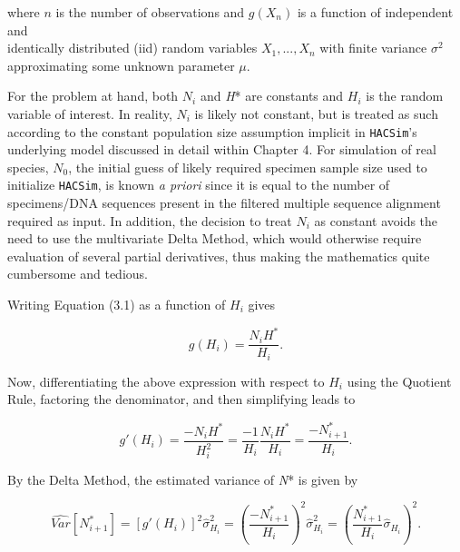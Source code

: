 \noindent where $n$ is the number of observations and $g(X_n)$ is a function of independent and \\ identically distributed (iid) random variables $X_1,...,X_n$ with finite variance $\sigma^2$ \\ approximating some unknown parameter $\mu$.

\vspace{5mm}

For the problem at hand, both $N_i$ and \textit{H}* are constants and $H_i$ is the random variable of interest. In reality, $N_i$ is likely not constant, but is treated as such according to the constant population size assumption implicit in {\tt HACSim}'s underlying model discussed in detail within Chapter 4. For simulation of real species, $N_0$, the initial guess of likely required specimen sample size used to initialize {\tt HACSim}, is known \textit{a priori} since it is equal to the number of specimens/DNA sequences present in the filtered multiple sequence alignment required as input. In addition, the decision to treat $N_i$ as constant avoids the need to use the multivariate Delta Method, which would otherwise require evaluation of several partial derivatives, thus making the mathematics quite cumbersome and tedious.  

\vspace{5mm}

Writing Equation (3.1) as a function of $H_i$ gives

\begin{equation}
g(H_i) = \frac{N_iH^*}{H_i}.
\end{equation}

\vspace{5mm}

Now, differentiating the above expression with respect to $H_i$ using the Quotient Rule, factoring the denominator, and then simplifying leads to

\begin{equation}
g'(H_i) = \frac{-N_iH^*}{H_i^2} = \frac{-1}{H_i}\frac{N_iH^*}{H_i} = \frac{-N^*_{i+1}}{H_i}.
\end{equation}

\vspace{5mm}

By the Delta Method, the estimated variance of \textit{N}* is given by

\begin{equation}
\widehat{Var}[N^*_{i+1}] = [g'(H_i)]^2\hat{\sigma}^2_{H_i} = \left(\frac{-N^*_{i+1}}{H_i}\right)^2\hat{\sigma}^2_{H_i} = \left(\frac{N^*_{i+1}}{H_i}\hat{\sigma}_{H_i}\right)^2.
\end{equation}

